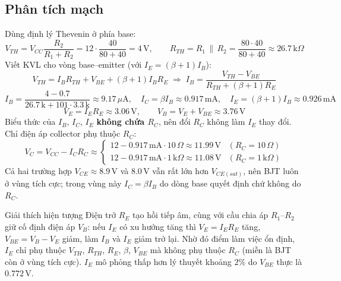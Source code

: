 \subsection{Phân tích mạch}
Dùng định lý Thevenin ở phía base:
\[ V_{TH} = V_{CC}\frac{R_2}{R_1 + R_2} = 12\cdot\frac{40}{80+40} = 4\,\text{V}, \qquad R_{TH} = R_1\,\|\,R_2 = \frac{80\cdot 40}{80+40} \approx 26.7\,\text{k}\Omega \]
Viết KVL cho vòng base--emitter (với $I_E = (\beta+1)I_B$):
\[ V_{TH} = I_B R_{TH} + V_{BE} + (\beta+1) I_B R_E \;\Rightarrow\; I_B = \frac{V_{TH} - V_{BE}}{R_{TH} + (\beta+1)R_E} \]
\[ I_B = \frac{4 - 0.7}{26.7\,\text{k} + 101\cdot 3.3\,\text{k}} \approx 9.17\,\mu\text{A}, \quad I_C = \beta I_B \approx 0.917\,\text{mA}, \quad I_E = (\beta+1) I_B \approx 0.926\,\text{mA} \]
\[ V_E = I_E R_E \approx 3.06\,\text{V}, \qquad V_B = V_E + V_{BE} \approx 3.76\,\text{V} \]
Biểu thức của $I_B$, $I_C$, $I_E$ \textbf{không chứa $R_C$}, nên đổi $R_C$ không làm $I_E$ thay đổi. Chỉ điện áp collector phụ thuộc $R_C$:
\[ V_C = V_{CC} - I_C R_C \approx \begin{cases} 12 - 0.917\,\text{mA}\cdot 10\,\Omega \approx 11.99\,\text{V} & (R_C = 10\,\Omega)\\ 12 - 0.917\,\text{mA}\cdot 1\,\text{k}\Omega \approx 11.08\,\text{V} & (R_C = 1\,\text{k}\Omega)\end{cases} \]
Cả hai trường hợp $V_{CE} \approx 8.9\,\text{V}$ và $8.0\,\text{V}$ vẫn rất lớn hơn $V_{CE(sat)}$, nên BJT luôn ở vùng tích cực; trong vùng này $I_C = \beta I_B$ do dòng base quyết định chứ không do $R_C$.

\begin{notebox}{Giải thích hiện tượng}
Điện trở $R_E$ tạo hồi tiếp âm, cùng với cầu chia áp $R_1$--$R_2$ giữ cố định điện áp $V_B$: nếu $I_E$ có xu hướng tăng thì $V_E = I_E R_E$ tăng, $V_{BE} = V_B - V_E$ giảm, làm $I_B$ và $I_E$ giảm trở lại. Nhờ đó điểm làm việc ổn định, $I_E$ chỉ phụ thuộc $V_{TH}$, $R_{TH}$, $R_E$, $\beta$, $V_{BE}$ mà không phụ thuộc $R_C$ (miễn là BJT còn ở vùng tích cực). $I_E$ mô phỏng thấp hơn lý thuyết khoảng $2\%$ do $V_{BE}$ thực là $0.772\,\text{V}$.
\end{notebox}
